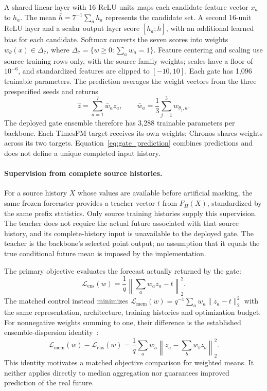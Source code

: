 A shared linear layer with 16 ReLU units maps each candidate feature vector $x_a$ to $h_a$. The mean $\bar h=7^{-1}\sum_a h_a$ represents the candidate set. A second 16-unit ReLU layer and a scalar output layer score $[h_a;\bar h]$, with an additional learned bias for each candidate. Softmax converts the seven scores into weights $w_\theta(x)\in\Delta_7$, where $\Delta_7=\{w\geq0:\sum_a w_a=1\}$. Feature centering and scaling use source training rows only, with the source family weights; scales have a floor of $10^{-6}$, and standardized features are clipped to $[-10,10]$. Each gate has 1,096 trainable parameters. The prediction averages the weight vectors from the three prespecified seeds and returns
\begin{equation}
 \widehat z=\sum_{a=1}^{7}\bar w_a z_a,
 \qquad \bar w_a=\frac{1}{3}\sum_{j=1}^{3}w_{\theta_j,a}.
 \label{eq:gate_prediction}
\end{equation}
The deployed gate ensemble therefore has 3,288 trainable parameters per backbone. Each TimesFM target receives its own weights; Chronos shares weights across its two targets. Equation~\ref{eq:gate_prediction} combines predictions and does not define a unique completed input history.

\paragraph{Supervision from complete source histories.}
For a source history $X$ whose values are available before artificial masking, the same frozen forecaster provides a teacher vector $t$ from $F_H(X)$, standardized by the same prefix statistics. Only source training histories supply this supervision. The teacher does not require the actual future associated with that source history, and its complete-history input is unavailable to the deployed gate. The teacher is the backbone's selected point output; no assumption that it equals the true conditional future mean is imposed by the implementation.

The primary objective evaluates the forecast actually returned by the gate:
\begin{equation}
 \mathcal{L}_{\mathrm{ens}}(w)
 =\frac{1}{q}\left\|\sum_a w_a z_a-t\right\|_2^2.
 \label{eq:gate_teacher_loss}
\end{equation}
The matched control instead minimizes
$\mathcal{L}_{\mathrm{mem}}(w)=q^{-1}\sum_a w_a\|z_a-t\|_2^2$
with the same representation, architecture, training histories and optimization budget. For nonnegative weights summing to one, their difference is the established ensemble-dispersion identity~\citep{krogh1994ensembles}:
\begin{equation}
 \mathcal{L}_{\mathrm{mem}}(w)-\mathcal{L}_{\mathrm{ens}}(w)
 =\frac{1}{q}\sum_a w_a\left\|z_a-\sum_b w_bz_b\right\|_2^2.
 \label{eq:gate_dispersion}
\end{equation}
This identity motivates a matched objective comparison for weighted means. It neither applies directly to median aggregation nor guarantees improved prediction of the real future.

